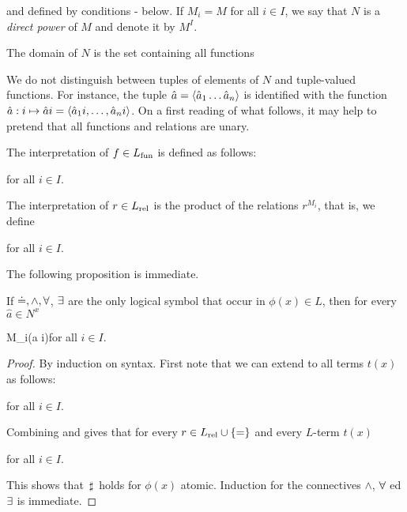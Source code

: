 \smallskip

and defined by conditions - below.
If $M_i=M$ for all $i\in I$, we say that $N$ is a \emph{direct power\/} of $M$ and denote it by \emph{$M^I$.}

The domain of $N$ is the set containing all functions

\smallskip


We do not distinguish between tuples of elements of $N$ and tuple-valued functions.
For instance, the tuple $\hat a=\langle\hat a_1\dots\hat a_n\rangle$ is identified with the function $\hat a:i\mapsto\hat ai=\langle\hat a_1i,\dots,\hat a_ni\rangle$.
On a first reading of what follows, it may help to pretend that all functions and relations are unary.

The interpretation of $f\in L_{\rm fun}$ is defined as follows:

\hfill  for all $i\in I$.

The interpretation of $r\in L_{\rm rel}$ is the product of the relations $r^{M_i}$, that is, we define

\hfill  for all $i\in I$.


The following proposition is immediate.

\begin{proposition}\label{proposizioneprodottidiretti}
If $\doteq, \wedge, \forall$, $\exists$ are the only logical symbol that occur in $\phi(x)\in L$, then for every $\hat a\in N^{x}$

{\IFF}
{M_i\models\phi(\hat a i)}\hfill for all $i\in I$.

\end{proposition}

\begin{proof}
By induction on syntax.
First note that we can extend  to all terms $t(x)$ as follows:

\hfill  for all $i\in I$.

Combining  and  gives that for every $r\in L_{\rm rel}\cup\{=\}$ and every $L$-term $t(x)$

\hfill  for all $i\in I$.

This shows that $\,\sharp\,$ holds for $\phi(x)$ atomic.
Induction for the connectives $\wedge$, $\forall$ ed $\exists$ is immediate.
\end{proof}

